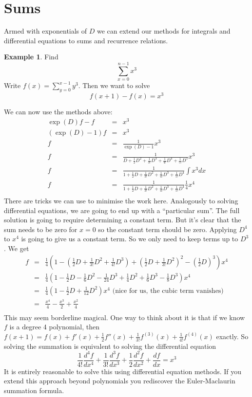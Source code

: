 \documentclass[a4paper]{article}
\theoremstyle{definition}
\newtheorem{example}{Example}[section]
\begin{document}
\section{Sums}
Armed with exponentials of $D$ we can extend our methods for integrals and differential equations to sums and recurrence relations.
\begin{example}
Find
\[
\sum_{x=0}^{n-1}x^3
\]
Write $f(x) = \sum_{y=0}^{x-1}y^3$.
Then we want to solve
\[
f(x+1)-f(x) = x^3
\]
\end{example}
We can now use the methods above:
\begin{eqnarray*}
\exp(D)f-f & = & x^3 \\
(\exp(D)-1)f & = & x^3 \\
f & = & \frac{1}{\exp(D)-1}x^3 \\
f & = & \frac{1}{D+\frac{1}{2}D^2+\frac{1}{3!}D^3+\frac{1}{4!}D^4+\frac{1}{5!}D^5}x^3 \\
f & = & \frac{1}{1+\frac{1}{2}D+\frac{1}{3!}D^2+\frac{1}{4!}D^3+\frac{1}{5!}D^4}\int x^3dx \\
f & = & \frac{1}{1+\frac{1}{2}D+\frac{1}{3!}D^2+\frac{1}{4!}D^3+\frac{1}{5!}D^4}\frac{1}{4}x^4 \\
\end{eqnarray*}
There are tricks we can use to minimise the work here.
Analogously to solving differential equations, we are going to end up with a ``particular sum''.
The full solution is going to require determining a constant term.
But it's clear that the sum needs to be zero for $x=0$ so the constant term should be zero.
Applying $D^4$ to $x^4$ is going to give us a constant term.
So we only need to keep terms up to $D^3$.
We get
\begin{eqnarray*}
f & = & \frac{1}{4}(1-(\frac{1}{2}D+\frac{1}{3!}D^2+\frac{1}{4!}D^3)+
        (\frac{1}{2}D+\frac{1}{3!}D^2)^2-(\frac{1}{2}D)^3)x^4 \\
  & = & \frac{1}{4}(1-\frac{1}{2}D-\frac{1}{6}D^2-\frac{1}{24}D^3+
        \frac{1}{4}D^2+\frac{1}{6}D^3-\frac{1}{8}D^3)x^4 \\
  & = & \frac{1}{4}(1-\frac{1}{2}D+\frac{1}{12}D^2)x^4 \mbox{ (nice for us, the cubic term vanishes)} \\
  & = & \frac{x^4}{4}-\frac{x^3}{2}+\frac{x^2}{4} \\
\end{eqnarray*}
This may seem borderline magical.
One way to think about it is that if we know $f$ is a degree 4 polynomial, then $f(x+1) = f(x)+f'(x)+\frac{1}{2}f''(x)+\frac{1}{3!}f^{(3)}(x)+\frac{1}{4!}f^{(4)}(x)$ exactly.
So solving the summation is equivalent to solving the differential equation
\[
\frac{1}{4!}\frac{d^4f}{dx^4}+\frac{1}{3!}\frac{d^3f}{dx^3}+\frac{1}{2}\frac{d^2f}{dx^2}+\frac{df}{dx} = x^3
\]
It is entirely reasonable to solve this using differential equation methods.
If you extend this approach beyond polynomials you rediscover the Euler-Maclaurin summation formula.
\end{document}
